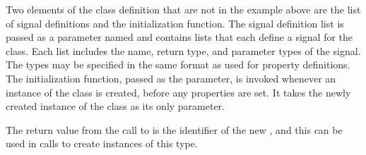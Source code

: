 \documentclass[article,shortnames]{jss}
\begin{document}
Two elements of the class definition that are not in the example above
are
the list of signal definitions and the initialization function.
The signal definition list is passed as a parameter named
 and contains lists that each define a signal for the
class. Each list includes the name, return type, and parameter types
of the signal. The types may be specified in the same format as used
for property definitions. The initialization function, passed as the
 parameter, is invoked whenever an instance of
the class is created, before any properties are set. It takes the
newly created instance of the class as its only parameter.





The return value from the call to  is the identifier of
the new , and this can be used in calls to create
instances of this type.
\end{document}

